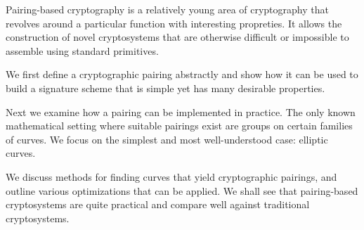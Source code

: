 \beforepreface
{}
Pairing-based cryptography is a relatively young area of cryptography that
revolves around a particular function with interesting propreties.
It allows the construction of novel cryptosystems that are otherwise
difficult or impossible to assemble using standard primitives.

We first define a cryptographic pairing abstractly and show how it
can be used to build a signature scheme that is simple yet has many
desirable properties.

Next we examine how a pairing can be implemented in practice. The only known
mathematical setting where suitable pairings exist are groups on certain
families of curves. We focus on the simplest and most well-understood case:
elliptic curves.

We discuss methods for finding curves that yield cryptographic pairings,
and outline various optimizations that can be applied. We shall see that
pairing-based cryptosystems are quite practical and compare well against
traditional cryptosystems.
